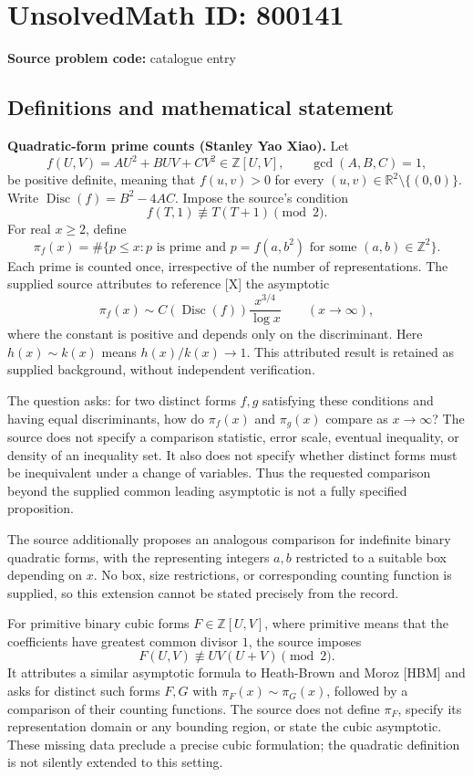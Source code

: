 \documentclass[11pt]{article}
\newcommand{\Z}{\mathbb{Z}}
\newcommand{\R}{\mathbb{R}}
\begin{document}
\section*{UnsolvedMath ID: 800141}
\textbf{Source problem code:} catalogue entry
\subsection{Definitions and mathematical statement}
\textbf{Quadratic-form prime counts (Stanley Yao Xiao).}
Let
\[
f(U,V)=AU^2+BUV+CV^2\in\Z[U,V],\qquad \gcd(A,B,C)=1,
\]
be positive definite, meaning that \(f(u,v)>0\) for every \((u,v)\in\R^2\setminus\{(0,0)\}\). Write \(\operatorname{Disc}(f)=B^2-4AC\). Impose the source's condition
\[
f(T,1)\not\equiv T(T+1)\pmod 2.
\]
For real \(x\ge2\), define
\[
\pi_f(x)=\#\{p\le x:p\text{ is prime and }p=f(a,b^2)\text{ for some }(a,b)\in\Z^2\}.
\]
Each prime is counted once, irrespective of the number of representations. The supplied source attributes to reference [X] the asymptotic
\[
\pi_f(x)\sim C(\operatorname{Disc}(f))\frac{x^{3/4}}{\log x}
\qquad(x\to\infty),
\]
where the constant is positive and depends only on the discriminant. Here \(h(x)\sim k(x)\) means \(h(x)/k(x)\to1\). This attributed result is retained as supplied background, without independent verification.

The question asks: for two distinct forms \(f,g\) satisfying these conditions and having equal discriminants, how do \(\pi_f(x)\) and \(\pi_g(x)\) compare as \(x\to\infty\)? The source does not specify a comparison statistic, error scale, eventual inequality, or density of an inequality set. It also does not specify whether distinct forms must be inequivalent under a change of variables. Thus the requested comparison beyond the supplied common leading asymptotic is not a fully specified proposition.

The source additionally proposes an analogous comparison for indefinite binary quadratic forms, with the representing integers \(a,b\) restricted to a suitable box depending on \(x\). No box, size restrictions, or corresponding counting function is supplied, so this extension cannot be stated precisely from the record.

For primitive binary cubic forms \(F\in\Z[U,V]\), where primitive means that the coefficients have greatest common divisor \(1\), the source imposes
\[
F(U,V)\not\equiv UV(U+V)\pmod2.
\]
It attributes a similar asymptotic formula to Heath-Brown and Moroz [HBM] and asks for distinct such forms \(F,G\) with \(\pi_F(x)\sim\pi_G(x)\), followed by a comparison of their counting functions. The source does not define \(\pi_F\), specify its representation domain or any bounding region, or state the cubic asymptotic. These missing data preclude a precise cubic formulation; the quadratic definition is not silently extended to this setting.
\end{document}
